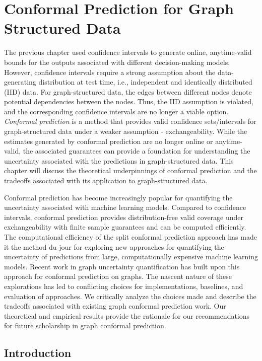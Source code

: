 \chapter{Conformal Prediction for Graph Structured Data}
\label{chp:graphConformal}
The previous chapter used confidence intervals to generate online, anytime-valid bounds for the outputs associated with different decision-making models.
However, confidence intervals require a strong assumption about the data-generating distribution at test time, i.e., independent and identically distributed (IID) data.
For graph-structured data, the edges between different nodes denote potential dependencies between the nodes.
Thus, the IID assumption is violated, and the corresponding confidence intervals are no longer a viable option.
\emph{Conformal prediction} is a method that provides valid confidence sets/intervals for graph-structured data under a weaker assumption - exchangeability.
While the estimates generated by conformal prediction are no longer online or anytime-valid, the associated guarantees can provide a foundation for understanding the uncertainty associated with the predictions in graph-structured data.
This chapter will discuss the theoretical underpinnings of conformal prediction and the tradeoffs associated with its application to graph-structured data.

Conformal prediction has become increasingly popular for quantifying the uncertainty associated with machine learning models. 
Compared to confidence intervals, conformal prediction provides distribution-free valid coverage under exchangeability with finite sample guarantees and can be computed efficiently.
The computational efficiency of the split conformal prediction approach has made it the method du jour for exploring new approaches for quantifying the uncertainty of predictions from large, computationally expensive machine learning models.
Recent work in graph uncertainty quantification has built upon this approach for conformal prediction on graphs.
The nascent nature of these explorations has led to conflicting choices for implementations, baselines, and evaluation of approaches.
We critically analyze the choices made and describe the tradeoffs associated with existing graph conformal prediction work. 
Our theoretical and empirical results provide the rationale for our recommendations for future scholarship in graph conformal prediction.

\section{Introduction}


